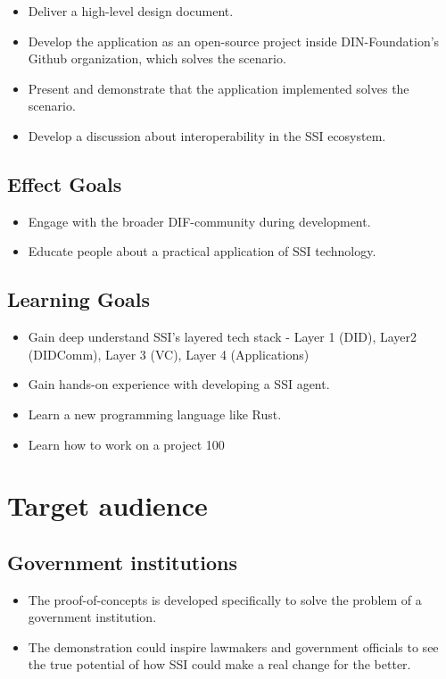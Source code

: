 \begin{itemize}
\item Deliver a high-level design document.
\item Develop the application as an open-source project inside DIN-Foundation's Github organization, which solves the scenario.
\item Present and demonstrate that the application implemented solves the scenario.
\item Develop a discussion about interoperability in the SSI ecosystem.
\end{itemize}

\subsection{Effect Goals}

\begin{itemize}
\item Engage with the broader DIF-community during development.
\item Educate people about a practical application of SSI technology.
\end{itemize}

\subsection{Learning Goals}

\begin{itemize}
\item Gain deep understand SSI's layered tech stack - Layer 1 (DID), Layer2 (DIDComm), Layer 3 (VC), Layer 4 (Applications)
\item Gain hands-on experience with developing a SSI agent.
\item Learn a new programming language like Rust.
\item Learn how to work on a project 100%
\end{itemize}



\section{Target audience}

\subsection{Government institutions}

\begin{itemize}
\item The proof-of-concepts is developed specifically to solve the problem of a government institution.
\item The demonstration could inspire lawmakers and government officials to see the true potential of how SSI could make a real change for the better.
\end{itemize}

